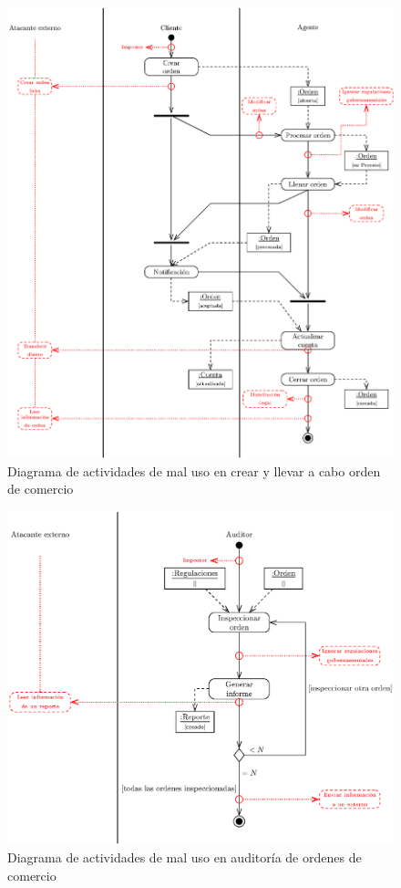 \begin{figure}[htp!]
\centering
    	\includegraphics[scale=0.55]{Imagenes/diag_activity_createOrder_misuse_esp.eps}
 	\caption{Diagrama de actividades de mal uso en crear y llevar a cabo orden de comercio}
	\label{CU3y4_misuse}
\end{figure}

\begin{figure}[htp!]
\centering
    	\includegraphics[scale=0.55]{Imagenes/diag_activity_checkTrade_misuse_esp.eps}
 	\caption{Diagrama de actividades de mal uso en auditoría de ordenes de comercio}
	\label{CU5_misuse}
\end{figure}


